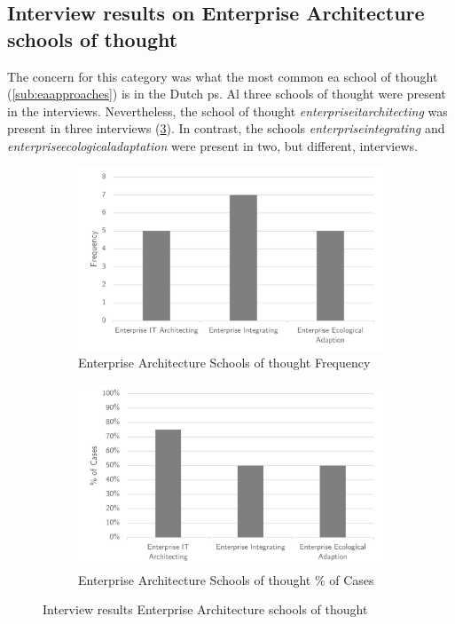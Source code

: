 \subsection{Interview results on Enterprise Architecture schools of thought}
\label{sub:interviewresultseaschools}
The concern for this category was what the most common \gls{ea} school of thought (\cref{sub:eaapproaches}) is in the Dutch \gls{ps}. Al three schools of thought were present in the interviews. Nevertheless, the school of thought \textit{\gls{enterpriseitarchitecting}} was present in three interviews (\cref{fig:intervieweaschoolsantifragile}). In contrast, the schools \textit{\gls{enterpriseintegrating}} and \textit{\gls{enterpriseecologicaladaptation}} were present in two, but different, interviews.
\begin{figure}[H]
	\centering
	\begin{subfigure}[H]{0.5\textwidth}
		\centering
		\includegraphics[width=0.95\linewidth]{images/easchools_frequency}
		\caption{Enterprise Architecture Schools of thought Frequency}
		\label{fig:easchoolsfrequency}
	\end{subfigure}%
	\begin{subfigure}[H]{0.5\textwidth}
		\centering
		\includegraphics[width=0.95\linewidth]{images/easchools_cases}
		\caption{Enterprise Architecture Schools of thought \% of Cases}
		\label{fig:easchoolscases}
	\end{subfigure}
	\caption{Interview results Enterprise Architecture schools of thought}
	\label{fig:intervieweaschoolsantifragile}
\end{figure}
